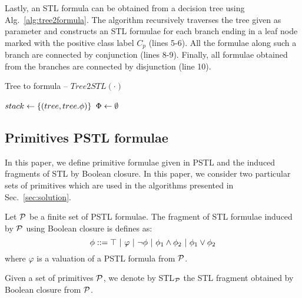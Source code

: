 Lastly, an STL formula can be obtained from
a decision tree using Alg.~\ref{alg:tree2formula}.
The algorithm recursively traverses the tree
given as parameter and constructs an STL
formulae for each branch ending in a leaf node
marked with the positive class label $C_p$ (lines 5-6).
All the formulae along such a branch are connected
by conjunction (lines 8-9). Finally, all formulae
obtained from the branches are connected by
disjunction (line 10).

\begin{algorithm}
\caption{Tree to formula -- $Tree2STL(\cdot)$}
\label{alg:tree2formula}
\DontPrintSemicolon
{}
\BlankLine

$stack \leftarrow \{(tree, tree.\phi)\}$\;
$\Phi \leftarrow \emptyset$\;

\Return{$\bigvee_{\phi \in \Phi} \phi$}
\end{algorithm}

\subsection{Primitives PSTL formulae}\label{sec:primitive}

In this paper, we define primitive formulae given in PSTL and the induced fragments of STL by Boolean closure.
In this paper, we consider two particular sets of primitives which are used in the algorithms presented in Sec.~\ref{sec:solution}.

\begin{definition}
\label{def:boolean-closure}
Let $\mathcal{P}$ be a finite set of PSTL formulae.
The fragment of STL formulae induced by $\mathcal{P}$ using Boolean closure is defines as:
\begin{equation*}
\label{eq:boolean-closure}
\phi ::= \top \ |\ \varphi \ |\ \neg\phi \ |\ \phi_1 \wedge \phi_2 \ |\ \phi_1 \vee \phi_2
\end{equation*}
where $\varphi$ is a valuation of a PSTL formula from $\mathcal{P}$.
\end{definition}

Given a set of primitives $\mathcal{P}$, we denote by STL$_{\mathcal{P}}$ the STL fragment obtained by Boolean closure from $\mathcal{P}$.


